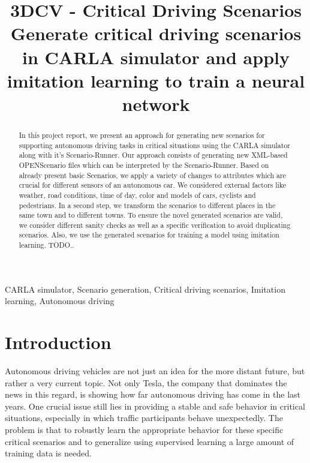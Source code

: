 \documentclass[conference, 11pt]{IEEEtran}
\begin{document}
\title{3DCV - Critical Driving Scenarios\\
{\small Generate critical driving scenarios in CARLA simulator and apply imitation learning to train a neural network}
}

\author{
    \and
    \and
    \and
}

\maketitle

\begin{abstract}
	In this project report, we present an approach for generating new scenarios for supporting autonomous driving tasks in critical situations using the CARLA simulator along with it's Scenario-Runner. Our approach consists of generating new XML-based OPENScenario files which can be interpreted by the Scenario-Runner. Based on already present basic Scenarios, we apply a variety  of changes to attributes which are crucial for different sensors of an autonomous car. We considered external factors like weather, road conditions, time of day, color and models of cars, cyclists and pedestrians. In a second step, we transform the scenarios to different places in the same town and to different towns. To ensure the novel generated scenarios are valid, we consider different sanity checks as well as a specific verification to avoid duplicating scenarios.
	Also, we use the generated scenarios for training a model using imitation learning. TODO..

\end{abstract}

\begin{IEEEkeywords}
CARLA simulator, Scenario generation, Critical driving scenarios, Imitation learning, Autonomous driving
\end{IEEEkeywords}

\section{Introduction}
Autonomous driving vehicles are not just an idea for the more distant future, but rather a very current topic.
Not only Tesla, the company that dominates the news in this regard, is showing how far autonomous driving has come in the last years.
One crucial issue still lies in providing a stable and safe behavior in critical situations, especially in which traffic participants behave unexpectedly. 
The problem is that to robustly learn the appropriate behavior for these specific critical scenarios and to generalize using supervised learning a large amount of training data is needed.
\end{document}
